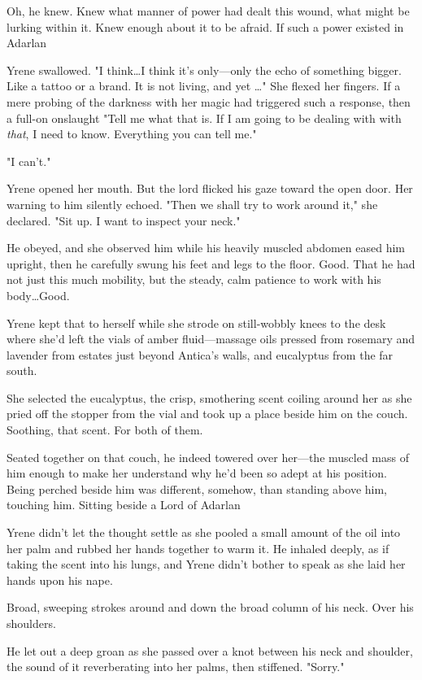 Oh, he knew.
Knew what manner of power had dealt this wound, what might be lurking within it.
Knew enough about it to be afraid.
If such a power existed in Adarlan 

Yrene swallowed.
"I think\ldots I think it's only---only the echo of something bigger.
Like a tattoo or a brand.
It is not living, and yet \ldots" She flexed her fingers.
If a mere probing of the darkness with her magic had triggered such a response, then a full-on onslaught  "Tell me what that is.
If I am going to be dealing with  with \emph{that}, I need to know.
Everything you can tell me."

"I can't."

Yrene opened her mouth.
But the lord flicked his gaze toward the open door.
Her warning to him silently echoed.
"Then we shall try to work around it," she declared.
"Sit up.
I want to inspect your neck."

He obeyed, and she observed him while his heavily muscled abdomen eased him upright, then he carefully swung his feet and legs to the floor.
Good.
That he had not just this much mobility, but the steady, calm patience to work with his body\ldots Good.

Yrene kept that to herself while she strode on still-wobbly knees to the desk where she'd left the vials of amber fluid---massage oils pressed from rosemary and lavender from estates just beyond Antica's walls, and eucalyptus from the far south.

She selected the eucalyptus, the crisp, smothering scent coiling around her as she pried off the stopper from the vial and took up a place beside him on the couch.
Soothing, that scent.
For both of them.

Seated together on that couch, he indeed towered over her---the muscled mass of him enough to make her understand why he'd been so adept at his position.
Being perched beside him was different, somehow, than standing above him, touching him.
Sitting beside a Lord of Adarlan 

Yrene didn't let the thought settle as she pooled a small amount of the oil into her palm and rubbed her hands together to warm it.
He inhaled deeply, as if taking the scent into his lungs, and Yrene didn't bother to speak as she laid her hands upon his nape.

Broad, sweeping strokes around and down the broad column of his neck.
Over his shoulders.

He let out a deep groan as she passed over a knot between his neck and shoulder, the sound of it reverberating into her palms, then stiffened.
"Sorry."

